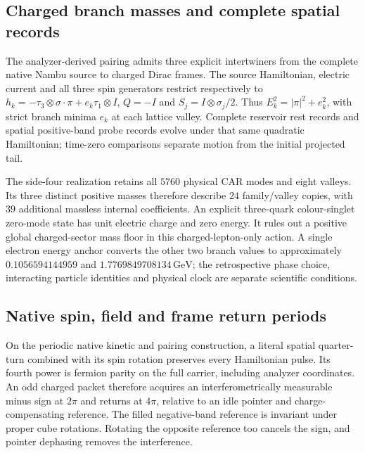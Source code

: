 \subsection{Charged branch masses and complete spatial records}

The analyzer-derived pairing admits three explicit intertwiners from
the complete native Nambu source to charged Dirac frames. The source
Hamiltonian, electric current and all three spin generators restrict
respectively to $h_k=-\tau_3\otimes\sigma\cdot\pi+e_k\tau_1\otimes I$,
$Q=-I$ and $S_j=I\otimes\sigma_j/2$. Thus
$E_k^2=|\pi|^2+e_k^2$, with strict branch minima $e_k$ at each lattice
valley. Complete reservoir rest records and spatial positive-band probe
records evolve under that same quadratic Hamiltonian; time-zero
comparisons separate motion from the initial projected tail.

The side-four realization retains all $5760$ physical CAR modes and
eight valleys. Its three distinct positive masses therefore describe
$24$ family/valley copies, with $39$ additional massless internal
coefficients. An explicit three-quark colour-singlet zero-mode state has
unit electric charge and zero energy. It rules out a positive global
charged-sector mass floor in this charged-lepton-only action. A single
electron energy anchor converts the other two branch values to
approximately $0.1056594144959$ and $1.7769849708134\,\mathrm{GeV}$;
the retrospective phase choice, interacting particle identities and
physical clock are separate scientific conditions.

\subsection{Native spin, field and frame return periods}

On the periodic native kinetic and pairing construction, a literal spatial
quarter-turn combined with its spin rotation preserves every Hamiltonian
pulse. Its fourth power is fermion parity on the full carrier, including
analyzer coordinates. An odd charged packet therefore acquires an
interferometrically measurable minus sign at $2\pi$ and returns at $4\pi$,
relative to an idle pointer and charge-compensating reference. The filled
negative-band reference is invariant under proper cube rotations. Rotating
the opposite reference too cancels the sign, and pointer dephasing removes
the interference.

